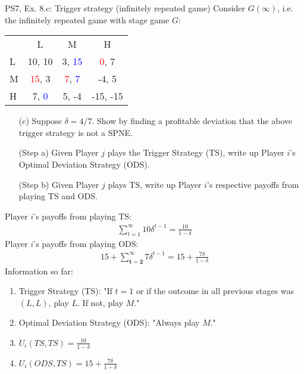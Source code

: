 \begin{frame}{PS7, Ex. 8.c: Trigger strategy (infinitely repeated game)}
    Consider $G(\infty)$, i.e. the infinitely repeated game with stage game $G$: \vspace{-6pt}
    \begin{table}
      \begin{tabular}{l|c|c|c|}
        \multicolumn{1}{c}{} & \multicolumn{1}{c}{L} & \multicolumn{1}{c}{M} & \multicolumn{1}{c}{H} \\\cline{2-4}
        L & 10, 10 & 3, \textcolor{blue}{15} & \textcolor{red}{0}, 7 \\\cline{2-4}
        M & \textcolor{red}{15}, 3 & \textcolor{red}{7}, \textcolor{blue}{7} & -4, 5 \\\cline{2-4}
        H & 7, \textcolor{blue}{0} & 5, -4 & -15, -15 \\\cline{2-4}
      \end{tabular}
    \end{table}
    \begin{itemize}
      \vspace{-4pt} \item[(c)] Suppose $\delta = 4/7$. Show by finding a profitable deviation that the above trigger strategy is not a SPNE. \vspace{-6pt}
    \end{itemize}
  \begin{multicols}{2}
    \begin{itemize}
      \item[(Step a)] Given Player $j$ plays the Trigger Strategy (TS), write up Player $i$'s Optimal Deviation Strategy (ODS).
      \item[(Step b)] Given Player $j$ plays TS, write up Player $i$'s respective payoffs from playing TS and ODS.
    \end{itemize}
    Player $i$'s payoffs from playing TS:
    \vspace{-4pt}
    \begin{align*}
      \sum_{t=1}^\infty10\delta^{t-1}=\frac{10}{1-\delta}
    \end{align*}
    Player $i$'s payoffs from playing ODS:
    \vspace{-4pt}
    \begin{align*}
      15+\sum_{\bm{t=2}}^\infty7\delta^{t-1}=15+\frac{7\delta}{1-\delta}
    \end{align*}
    \vfill\null\columnbreak
    Information so far:
    \begin{enumerate}
      \item Trigger Strategy (TS): "If $t=1$ or if the outcome in all previous stages was $(L,L)$, play $L$. If not, play $M$."
      \item Optimal Deviation Strategy (ODS): "Always play $M$."
      \item $U_i(TS,TS)=\frac{10}{1-\delta}$
      \item $U_i(ODS,TS)=15+\frac{7\delta}{1-\delta}$
    \end{enumerate}
    \vfill\null
  \end{multicols}
\end{frame}
